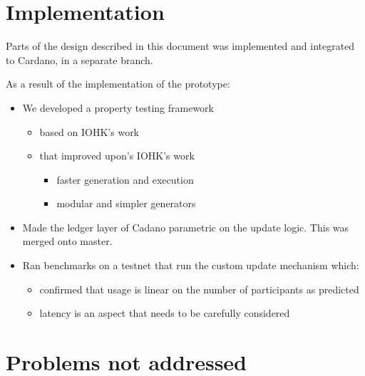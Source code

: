 \documentclass[11pt,a4paper]{article}
\begin{document}


\section{Implementation}
\label{sec:implementation-1}

Parts of the design described in this document was implemented and integrated to Cardano,
in a separate branch.


As a result of the implementation of the prototype:
\begin{itemize}
\item We developed a property testing framework
  \begin{itemize}
  \item based on IOHK's work
  \item that improved upon's IOHK's work
    \begin{itemize}
    \item faster generation and execution
    \item modular and simpler generators
    \end{itemize}
  \end{itemize}
\item Made the ledger layer of Cadano parametric on the update logic. This was
  merged onto master.
\item Ran benchmarks on a testnet that run the custom update mechanism which:
  \begin{itemize}
  \item confirmed that usage is linear on the number of participants as predicted
  \item latency is an aspect that needs to be carefully considered
  \end{itemize}
\end{itemize}


\section{Problems not addressed}
\label{sec:probl-not-addr}

\end{document}
